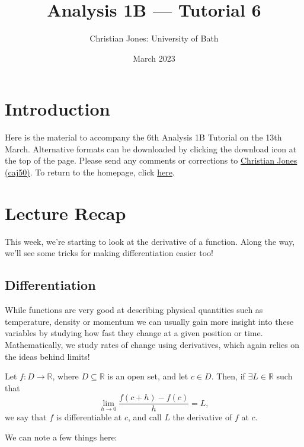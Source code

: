 \documentclass[
  17pt,
  a4paper]{extarticle}
\title{Analysis 1B --- Tutorial 6}
\author{Christian Jones: University of Bath}
\date{March 2023}
\theoremstyle{plain}
\theoremstyle{definition}
\theoremstyle{plain}
\theoremstyle{plain}
\theoremstyle{plain}
\theoremstyle{plain}
\theoremstyle{definition}
\theoremstyle{definition}
\theoremstyle{remark}
\theoremstyle{remark}
\let\BeginKnitrBlock\begin \let\EndKnitrBlock\end
\renewcommand{\;}{\,}
\begin{document}
\maketitle

{
\setcounter{tocdepth}{2}
\tableofcontents
}
\newpage
{}

\hypertarget{introduction}{%
\section*{Introduction}\label{introduction}}

Here is the material to accompany the 6th Analysis 1B Tutorial on the 13th March. Alternative formats can be downloaded by clicking the download icon at the top of the page. Please send any comments or corrections to \href{mailto:caj50@bath.ac.uk}{Christian Jones (caj50)}. To return to the homepage, click \href{http://caj50.github.io/tutoring.html}{here}.

\hypertarget{lecture-recap}{%
\section{Lecture Recap}\label{lecture-recap}}

This week, we're starting to look at the derivative of a function. Along the way, we'll see some tricks for making differentiation easier too!

\hypertarget{differentiation}{%
\subsection{Differentiation}\label{differentiation}}

While functions are very good at describing physical quantities such as temperature, density or momentum we can usually gain more insight into these variables by studying how fast they change at a given position or time. Mathematically, we study rates of change using derivatives, which again relies on the ideas behind limits!

\BeginKnitrBlock{definition}[Derivative]
{\label{def:def1} }Let \(f: D \to \mathbb{R}\), where \(D \subseteq \mathbb{R}\) is an open set, and let \(c \in D\). Then, if \(\exists L \in \mathbb{R}\) such that \[\lim_{h \to 0}\frac{f(c+h) - f(c)}{h} = L,\] we say that \(f\) is differentiable at \(c\), and call \(L\) the derivative of \(f\) at \(c\).
\EndKnitrBlock{definition}
We can note a few things here:
\end{document}
